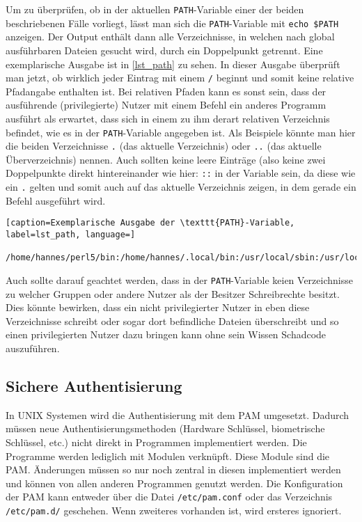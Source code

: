 Um zu überprüfen, ob in der aktuellen \texttt{PATH}-Variable einer der beiden beschriebenen Fälle vorliegt, lässt man sich die \texttt{PATH}-Variable mit \lstinline|echo $PATH| anzeigen. Der Output enthält dann alle Verzeichnisse, in welchen nach global ausführbaren Dateien gesucht wird, durch ein Doppelpunkt getrennt. Eine exemplarische Ausgabe ist in \autoref{lst_path} zu sehen. In dieser Ausgabe überprüft man jetzt, ob wirklich jeder Eintrag mit einem \texttt{/} beginnt und somit keine relative Pfadangabe enthalten ist.\cite[S. 48]{GuideSecureConfiguration2011} Bei relativen Pfaden kann es sonst sein, dass der ausführende {\small(privilegierte)} Nutzer mit einem Befehl ein anderes Programm ausführt als erwartet, dass sich in einem zu ihm derart relativen Verzeichnis befindet, wie es in der \texttt{PATH}-Variable angegeben ist. Als Beispiele könnte man hier die beiden Verzeichnisse \texttt{.} {\small(das aktuelle Verzeichnis)} oder \texttt{..} {\small(das aktuelle Überverzeichnis)} nennen. Auch sollten keine leere Einträge {\small(also keine zwei Doppelpunkte direkt hintereinander wie hier: \texttt{::}} in der Variable sein, da diese wie ein \texttt{.} gelten und somit auch auf das aktuelle Verzeichnis zeigen, in dem gerade ein Befehl ausgeführt wird.

\begin{lstlisting}[caption=Exemplarische Ausgabe der \texttt{PATH}-Variable, label=lst_path, language=]
	/home/hannes/perl5/bin:/home/hannes/.local/bin:/usr/local/sbin:/usr/local/bin:/usr/bin:/usr/lib/jvm/default/bin:/usr/bin/site_perl:/usr/bin/vendor_perl:/usr/bin/core_perl:/var/lib/snapd/snap/bin
\end{lstlisting}

Auch sollte darauf geachtet werden, dass in der \texttt{PATH}-Variable keien Verzeichnisse zu welcher Gruppen oder andere Nutzer als der Besitzer Schreibrechte besitzt.\cite[S. 48]{GuideSecureConfiguration2011} Dies könnte bewirken, dass ein nicht privilegierter Nutzer in eben diese Verzeichnisse schreibt oder sogar dort befindliche Dateien überschreibt und so einen privilegierten Nutzer dazu bringen kann ohne sein Wissen Schadcode auszuführen.

\subsection{Sichere Authentisierung}
In \ac{UNIX} Systemen wird die Authentisierung mit dem \ac{PAM} umgesetzt. Dadurch müssen neue Authentisierungsmethoden {\small(Hardware Schlüssel, biometrische Schlüssel, etc.)} nicht direkt in Programmen implementiert werden. Die Programme werden lediglich mit Modulen verknüpft. Diese Module sind die \ac{PAM}. Änderungen müssen so nur noch zentral in diesen implementiert werden und können von allen anderen Programmen genutzt werden.\cites{LinuxPAM}[S. 43]{GuideSecureConfiguration2011} Die Konfiguration der \ac{PAM} kann entweder über die Datei \texttt{/etc/pam.conf} oder das Verzeichnis \texttt{/etc/pam.d/} geschehen. Wenn zweiteres vorhanden ist, wird ersteres ignoriert.\cite{ChapterLinuxPAMConfiguration}


